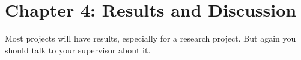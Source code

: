 \section*{Chapter 4: Results and Discussion}
\setcounter{section}{4} \setcounter{subsection}{0}

Most projects will have results, especially for a research project. But again you should talk to your supervisor about it.

